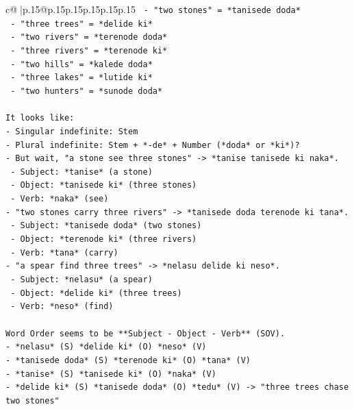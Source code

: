 \documentclass{article}
\begin{document}
{\begin{supertabular}{c@{$\;$}|p{.15\linewidth}@{}p{.15\linewidth}p{.15\linewidth}p{.15\linewidth}p{.15\linewidth}p{.15\linewidth}}
{{{\texttt{  {-} "two stones" = *tanisede doda*} \\
\texttt{  {-} "three trees" = *delide ki*} \\
\texttt{  {-} "two rivers" = *terenode doda*} \\
\texttt{  {-} "three rivers" = *terenode ki*} \\
\texttt{  {-} "two hills" = *kalede doda*} \\
\texttt{  {-} "three lakes" = *lutide ki*} \\
\texttt{  {-} "two hunters" = *sunode doda*} \\
\\ 
\texttt{It looks like:} \\
\texttt{{-} Singular indefinite: Stem} \\
\texttt{{-} Plural indefinite: Stem + *{-}de* + Number (*doda* or *ki*)?} \\
\texttt{{-} But wait, "a stone see three stones" {-}> *tanise tanisede ki naka*.} \\
\texttt{  {-} Subject: *tanise* (a stone)} \\
\texttt{  {-} Object: *tanisede ki* (three stones)} \\
\texttt{  {-} Verb: *naka* (see)} \\
\texttt{{-} "two stones carry three rivers" {-}> *tanisede doda terenode ki tana*.} \\
\texttt{  {-} Subject: *tanisede doda* (two stones)} \\
\texttt{  {-} Object: *terenode ki* (three rivers)} \\
\texttt{  {-} Verb: *tana* (carry)} \\
\texttt{{-} "a spear find three trees" {-}> *nelasu delide ki neso*.} \\
\texttt{  {-} Subject: *nelasu* (a spear)} \\
\texttt{  {-} Object: *delide ki* (three trees)} \\
\texttt{  {-} Verb: *neso* (find)} \\
\\ 
\texttt{Word Order seems to be **Subject {-} Object {-} Verb** (SOV).} \\
\texttt{{-} *nelasu* (S) *delide ki* (O) *neso* (V)} \\
\texttt{{-} *tanisede doda* (S) *terenode ki* (O) *tana* (V)} \\
\texttt{{-} *tanise* (S) *tanisede ki* (O) *naka* (V)} \\
\texttt{{-} *delide ki* (S) *tanisede doda* (O) *tedu* (V) {-}> "three trees chase two stones"} \\
}}}
\end{supertabular}}
\end{document}
